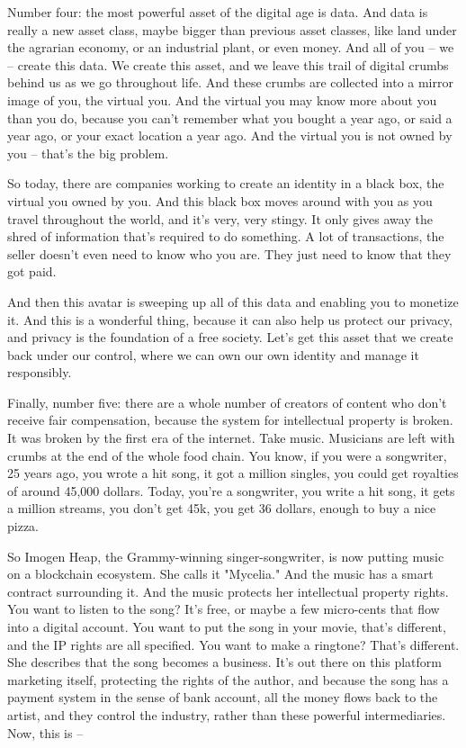 \documentclass[a4paper]{article}
\begin{document}
Number four: the most powerful asset of the digital age is data. And data is really a new asset class, maybe bigger than previous asset classes, like land under the agrarian economy, or an industrial plant, or even money. And all of you -- we -- create this data. We create this asset, and we leave this trail of digital crumbs behind us as we go throughout life. And these crumbs are collected into a mirror image of you, the virtual you. And the virtual you may know more about you than you do, because you can't remember what you bought a year ago, or said a year ago, or your exact location a year ago. And the virtual you is not owned by you -- that's the big problem.

So today, there are companies working to create an identity in a black box, the virtual you owned by you. And this black box moves around with you as you travel throughout the world, and it's very, very stingy. It only gives away the shred of information that's required to do something. A lot of transactions, the seller doesn't even need to know who you are. They just need to know that they got paid.

And then this avatar is sweeping up all of this data and enabling you to monetize it. And this is a wonderful thing, because it can also help us protect our privacy, and privacy is the foundation of a free society. Let's get this asset that we create back under our control, where we can own our own identity and manage it responsibly.

Finally, number five: there are a whole number of creators of content who don't receive fair compensation, because the system for intellectual property is broken. It was broken by the first era of the internet. Take music. Musicians are left with crumbs at the end of the whole food chain. You know, if you were a songwriter, 25 years ago, you wrote a hit song, it got a million singles, you could get royalties of around 45,000 dollars. Today, you're a songwriter, you write a hit song, it gets a million streams, you don't get 45k, you get 36 dollars, enough to buy a nice pizza.

So Imogen Heap, the Grammy-winning singer-songwriter, is now putting music on a blockchain ecosystem. She calls it "Mycelia." And the music has a smart contract surrounding it. And the music protects her intellectual property rights. You want to listen to the song? It's free, or maybe a few micro-cents that flow into a digital account. You want to put the song in your movie, that's different, and the IP rights are all specified. You want to make a ringtone? That's different. She describes that the song becomes a business. It's out there on this platform marketing itself, protecting the rights of the author, and because the song has a payment system in the sense of bank account, all the money flows back to the artist, and they control the industry, rather than these powerful intermediaries. Now, this is --
\end{document}
